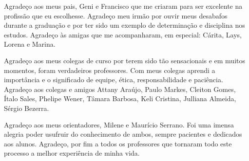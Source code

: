 \begin{agradecimentos}

Agradeço aos meus pais, Geni e Francisco que me criaram para ser excelente na profissão que eu escolhesse. Agradeço meu irmão por ouvir meus desabafos durante a graduação e por ter sido um exemplo de determinação e disciplina nos estudos. Agradeço às amigas que me acompanharam, em especial: Cárita, Lays, Lorena e Marina.

Agradeço aos meus colegas de curso por terem sido tão sensacionais e em muitos momentos, foram verdadeiros professores. Com meus colegas aprendi a importância e o significado de equipe, ética, responsabilidade e paciência. Agradeço aos colegas e amigos Attany Araújo, Paulo Markes, Cleiton Gomes, Ítalo Sales, Phelipe Wener, Tâmara Barbosa, Keli Cristina, Julliana Almeida, Sérgio Bezerra.

Agradeço aos meus orientadores, Milene e Maurício Serrano. Foi uma imensa alegria poder usufruir do conhecimento de ambos, sempre pacientes e dedicados aos alunos. Agradeço, por fim a todos os professores que tornaram todo este processo a melhor experiência de minha vida.

\end{agradecimentos}

